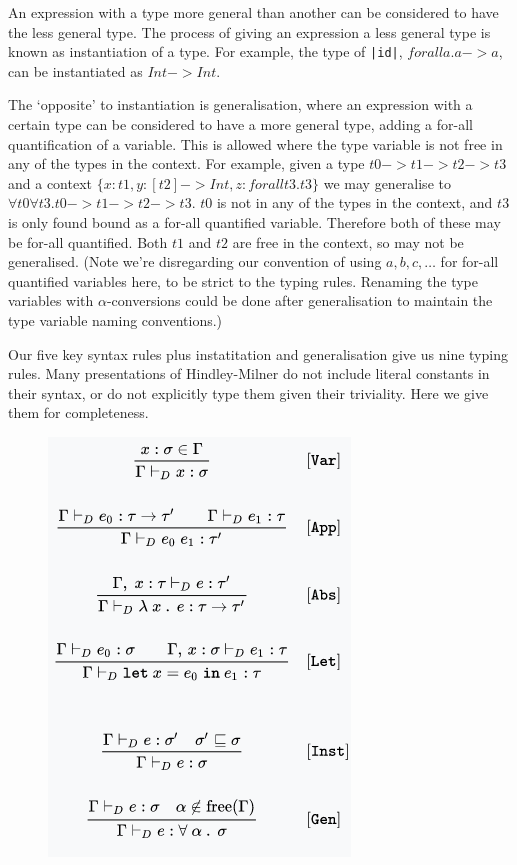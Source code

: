 \documentclass[a4paper,fleqn,12pt]{article}
\begin{document}
An expression with a type more general than another can be considered to have the less general type. The process of giving an expression a less general type is known as instantiation of a type. For example, the type of \texttt{|id|}, $forall a. a -> a$, can be instantiated as $Int -> Int$.

The ‘opposite’ to instantiation is generalisation, where an expression with a certain type can be considered to have a more general type, adding a for-all quantification of a variable. This is allowed where the type variable is not free in any of the types in the context. For example, given a type $t0 -> t1 -> t2 -> t3$ and a context $\{ x : t1, y : [t2] -> Int, z: forall t3. t3 \}$ we may generalise to $\forall t0 \forall t3. t0 -> t1 -> t2 -> t3$. $t0$ is not in any of the types in the context, and $t3$ is only found bound as a for-all quantified variable. Therefore both of these may be for-all quantified. Both $t1$ and $t2$ are free in the context, so may not be generalised. (Note we’re disregarding our convention of using $a, b, c, \dots$ for for-all quantified variables here, to be strict to the typing rules. Renaming the type variables with $\alpha$-conversions could be done after generalisation to maintain the type variable naming conventions.)

Our five key syntax rules plus instatitation and generalisation give us nine typing rules. Many presentations of Hindley-Milner do not include literal constants in their syntax, or do not explicitly type them given their triviality. Here we give them for completeness.

 \begin{figure}[h!]
  \centering
  \includegraphics[width=0.505\linewidth]{images/image5.png}
\end{figure}
\end{document}

